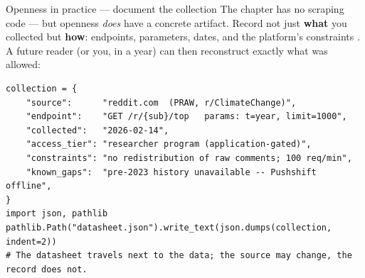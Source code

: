 \documentclass[9pt,aspectratio=169]{beamer}
\begin{document}
\begin{frame}[fragile]{Openness in practice --- document the collection}
    The chapter has no scraping code --- but openness \textit{does} have a concrete artifact. Record not just \textbf{what} you collected but \textbf{how}: endpoints, parameters, dates, and the platform's constraints \parencite{gebru2021datasheets}. A future reader (or you, in a year) can then reconstruct exactly what was allowed:
\begin{lstlisting}
collection = {
    "source":      "reddit.com  (PRAW, r/ClimateChange)",
    "endpoint":    "GET /r/{sub}/top   params: t=year, limit=1000",
    "collected":   "2026-02-14",
    "access_tier": "researcher program (application-gated)",
    "constraints": "no redistribution of raw comments; 100 req/min",
    "known_gaps":  "pre-2023 history unavailable -- Pushshift offline",
}
import json, pathlib
pathlib.Path("datasheet.json").write_text(json.dumps(collection, indent=2))
# The datasheet travels next to the data; the source may change, the record does not.
\end{lstlisting}
\end{frame}
\end{document}
